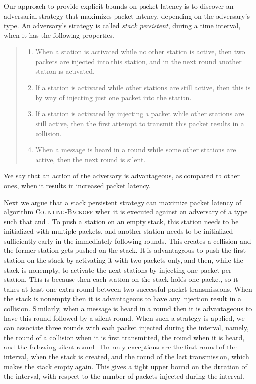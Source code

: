 \documentclass[11pt]{article}
\begin{document}
Our approach to provide explicit bounds on packet latency is to discover an adversarial strategy that maximizes packet latency, depending on the adversary's type.
An adversary's strategy is called \emph{stack persistent}, during a time interval,  when it has the following properties.
\begin{quote}
\begin{enumerate}
\item
When a station is activated while no other station is active, then two packets are injected into this station, and in the next round another station is activated.
\item
If a station is activated while other stations are still active, then this is by way of injecting just one packet into the station.
\item
If a station is activated by injecting a packet while other stations are still active, then the first attempt to transmit this packet results in a collision. 
\item
When a message is heard in a round while some other stations are active, then the next round is silent.
\end{enumerate}
\end{quote}
We say that an action of the adversary is advantageous, as compared to other ones, when it results in increased packet latency. 

Next we argue that a stack persistent strategy can maximize packet latency of algorithm \textsc{Counting-Back\-off} when it is executed against an adversary of a type  such that  and . 
To push a station on an empty stack, this station needs to be initialized with multiple packets, and another station needs to be initialized sufficiently early in the immediately following rounds.
This creates a collision and the former station gets pushed on the stack.
It is advantageous to push the first station on the stack by activating it with two packets only, and then, while the stack is nonempty, to activate the next stations by injecting one packet per station.
This is because then each station on the stack holds one packet, so it takes at least one extra round between two successful packet transmissions.
When the stack is nonempty then it is advantageous to have any injection result in a collision.
Similarly, when a message is heard in a round then it is advantageous to have this round followed by a silent round.
When such a strategy is applied, we can associate three rounds with each packet injected during the interval, namely, the round of a collision when it is first transmitted, the round when it is heard, and the following silent round.
The only exceptions are the first round of the interval, when the stack is created, and the round of the last transmission, which makes the stack empty again.
This gives a tight upper bound on the duration of the interval, with respect to the number of packets injected during the interval.
\end{document}
